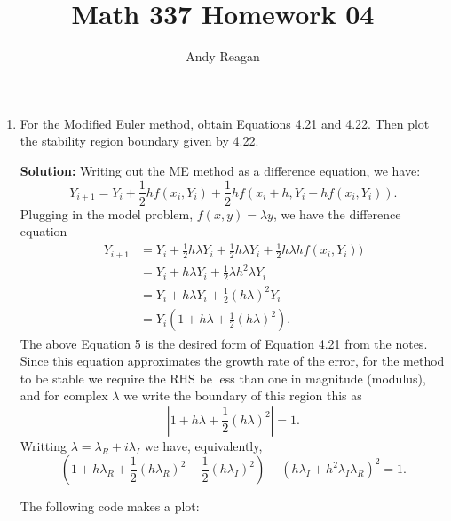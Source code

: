 \documentclass[11pt]{article}
\author{Andy Reagan}
\title{Math 337 Homework 04}
\def\f{\frac }
\begin{document}
\maketitle

\begin{enumerate}

\item For the Modified Euler method, obtain Equations 4.21 and 4.22.
Then plot the stability region boundary given by 4.22.

\bigskip
\textbf{Solution:} Writing out the ME method as a difference equation, we have:
\begin{equation} Y_{i+1} = Y_i + \f{1}{2} h f(x_i,Y_i) + \f{1}{2} hf(x_i+h,Y_i + hf(x_i, Y_i)) .\end{equation}
Plugging in the model problem, $f(x,y) = \lambda y$, we have the difference equation
\begin{align} Y_{i+1} &= Y_i + \f{1}{2}h  \lambda Y_i + \f{1}{2} h \lambda Y_i + \f{1}{2} h \lambda h f(x_i, Y_i))\\
&= Y_i + h  \lambda Y_i + \f{1}{2} \lambda h^2 \lambda Y_i \\
&= Y_i + h  \lambda Y_i + \f{1}{2} (h\lambda)^2 Y_i \\
&= Y_i \left( 1 + h  \lambda + \f{1}{2} (h\lambda)^2 \right ) .\end{align}
The above Equation 5 is the desired form of Equation 4.21 from the notes.
Since this equation approximates the growth rate of the error, for the method to be stable we require the RHS be less than one in magnitude (modulus), and for complex $\lambda$ we write the boundary of this region this as
\begin{equation} \left | 1 + h  \lambda + \f{1}{2} (h\lambda)^2 \right | = 1 .\end{equation}
Writting $\lambda = \lambda _R + i \lambda _I$ we have, equivalently,
\begin{equation} \left ( 1 + h  \lambda_R + \f{1}{2} (h\lambda_R)^2 - \f{1}{2} (h\lambda_I)^2 \right ) + \left ( h  \lambda_I + h^2\lambda_I\lambda_R \right ) ^2= 1 .\end{equation}

The following code makes a plot:



\end{enumerate}
\end{document}
